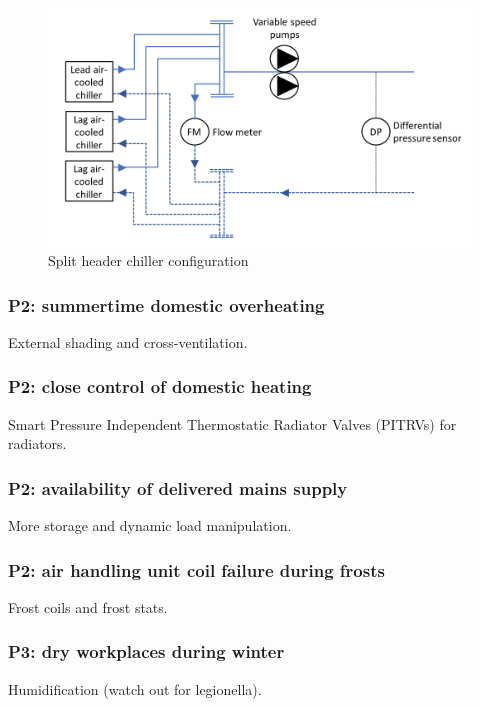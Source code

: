 \documentclass[11pt, oneside]{article}   	%
\begin{document}
\pagebreak

\FloatBarrier
\begin{figure}
\begin{center}
\includegraphics[width=1\textwidth]{splitHeader.PNG}
\caption{Split header chiller configuration}
\label{Split Header figure}
\end{center}
\end{figure}
\FloatBarrier

\pagebreak

\subsubsection{P2: summertime domestic overheating}
External shading and cross-ventilation.

\subsubsection{P2: close control of domestic heating}
Smart Pressure Independent Thermostatic Radiator Valves (PITRVs) for radiators.

\subsubsection{P2: availability of delivered mains supply}
More storage and dynamic load manipulation.

\subsubsection{P2: air handling unit coil failure during frosts}
Frost coils and frost stats.

\subsubsection{P3: dry workplaces during winter}
Humidification (watch out for legionella).
\end{document}
